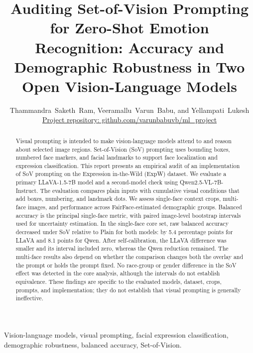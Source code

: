 \documentclass[lettersize,journal]{IEEEtran}
\begin{document}
\title{Auditing Set-of-Vision Prompting for Zero-Shot Emotion Recognition: Accuracy and Demographic Robustness in Two Open Vision-Language Models}

\author{Thammandra~Saketh~Ram, Veeramallu~Varun~Babu, and Yellampati~Lukesh\\\href{https://github.com/varunbabuvb/ml_project}{Project repository: github.com/varunbabuvb/ml\_project}}

\maketitle

\begin{abstract}
Visual prompting is intended to make vision-language models attend to and reason about selected image regions. Set-of-Vision (SoV) prompting uses bounding boxes, numbered face markers, and facial landmarks to support face localization and expression classification. This report presents an empirical audit of an implementation of SoV prompting on the Expression in-the-Wild (ExpW) dataset. We evaluate a primary LLaVA-1.5-7B model and a second-model check using Qwen2.5-VL-7B-Instruct. The evaluation compares plain inputs with cumulative visual conditions that add boxes, numbering, and landmark dots. We assess single-face context crops, multi-face images, and performance across FairFace-estimated demographic groups. Balanced accuracy is the principal single-face metric, with paired image-level bootstrap intervals used for uncertainty estimation. In the single-face core set, raw balanced accuracy decreased under SoV relative to Plain for both models: by 5.4 percentage points for LLaVA and 8.1 points for Qwen. After self-calibration, the LLaVA difference was smaller and its interval included zero, whereas the Qwen reduction remained. The multi-face results also depend on whether the comparison changes both the overlay and the prompt or holds the prompt fixed. No race-group or gender difference in the SoV effect was detected in the core analysis, although the intervals do not establish equivalence. These findings are specific to the evaluated models, dataset, crops, prompts, and implementation; they do not establish that visual prompting is generally ineffective.
\end{abstract}

\begin{IEEEkeywords}
Vision-language models, visual prompting, facial expression classification, demographic robustness, balanced accuracy, Set-of-Vision.
\end{IEEEkeywords}
\end{document}
